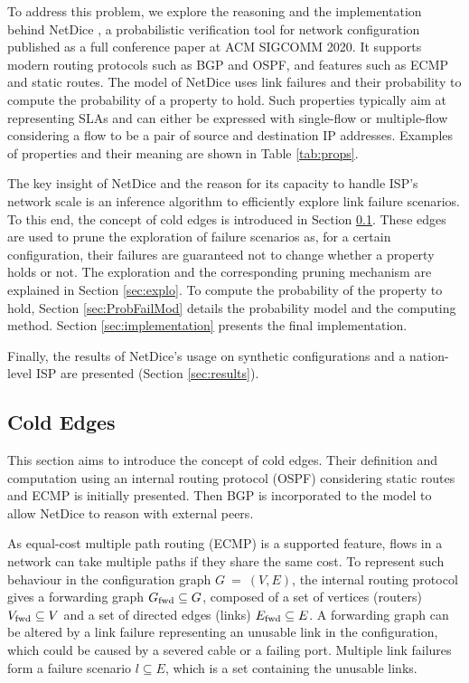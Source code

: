 To address this problem, we explore the reasoning and the implementation behind NetDice \cite{steffen2020netdice}, a probabilistic verification tool for network configuration published as a full conference paper at ACM SIGCOMM 2020. 
It supports modern routing protocols such as BGP and OSPF, and features such as ECMP and static routes.
The model of NetDice uses link failures and their probability to compute the probability of a property to hold.  
Such properties typically aim at representing SLAs and can either be expressed with single-flow or multiple-flow considering a flow to be a pair of source and destination IP addresses.
Examples of properties and their meaning are shown in Table \ref{tab:props}. 

The key insight of NetDice and the reason for its capacity to handle ISP's network scale is an inference algorithm to efficiently explore link failure scenarios. 
To this end, the concept of cold edges is introduced in Section \ref{sec:HotEdges}.
These edges are used to prune the exploration of failure scenarios as, for a certain configuration, their failures are guaranteed not to change whether a property holds or not.     
The exploration and the corresponding pruning mechanism are explained in Section \ref{sec:explo}. 
To compute the probability of the property to hold, Section \ref{sec:ProbFailMod} details the probability model and the computing method.  
Section \ref{sec:implementation} presents the final implementation. 

Finally, the results of NetDice's usage on synthetic configurations and a nation-level ISP are presented (Section \ref{sec:results}).

\subsection{Cold Edges}\label{sec:HotEdges}

This section aims to introduce the concept of cold edges.
Their definition and computation using an internal routing protocol (OSPF) considering static routes and ECMP is initially presented.
Then BGP is incorporated to the model to allow NetDice to reason with external peers.  

As equal-cost multiple path routing (ECMP) is a supported feature, flows in a network can take multiple paths if they share the same cost.
To represent such behaviour in the configuration graph $G~=~(V,E)$, the internal routing protocol gives a forwarding graph $G_\textnormal{fwd} \subseteq G$, composed of a set of vertices (routers) $V_\textnormal{fwd} \subseteq V$  and a set of directed edges (links) $E_\textnormal{fwd} \subseteq E$.
A forwarding graph can be altered by a link failure representing an unusable link in the configuration, which could be caused by a severed cable or a failing port.  
Multiple link failures form a failure scenario $l \subseteq E$, which is a set containing the unusable links.

